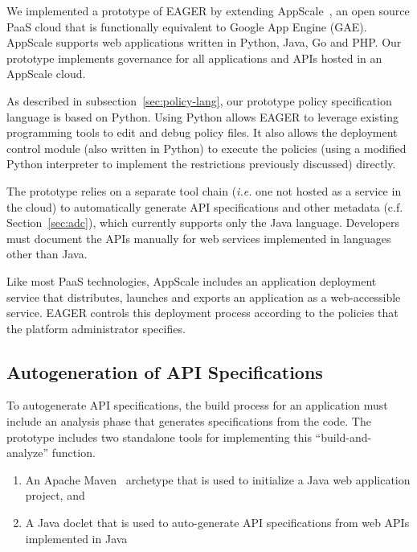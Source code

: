 We implemented a prototype of EAGER by extending AppScale~\cite{appscale13}, 
an open source PaaS cloud that is 
functionally equivalent to Google App Engine (GAE).  AppScale supports
web applications written in Python, Java, Go and PHP. Our prototype
implements governance for all applications and APIs hosted in an AppScale cloud. 

As described in subsection~\ref{sec:policy-lang}, 
our prototype policy specification
language is based on Python.
Using Python allows EAGER to leverage
existing programming tools to edit and debug policy files. 
It also allows the deployment control module (also written in Python) to
execute the policies (using a modified Python interpreter to implement the
restrictions previously discussed) directly.


The prototype relies on a separate tool chain ({\em i.e.} one not hosted as a
service in the cloud) to automatically generate
API specifications and other metadata (c.f. Section~\ref{sec:adc}), which
currently supports only the Java language.  
Developers must document the APIs manually
for web services implemented in languages other than Java.

Like most PaaS technologies, AppScale includes an application deployment
service that distributes, launches and exports an application
as a web-accessible service.  EAGER controls this deployment
process according to the policies that the platform administrator specifies.

\subsection{Autogeneration of API Specifications}
To autogenerate API specifications, the build process for an application must
include an analysis phase that generates specifications from the code.
The prototype includes two standalone tools for implementing this
``build-and-analyze'' function.
\begin{enumerate}
\vspace{0.05in}
\item An Apache Maven~\cite{maven} archetype that is used to initialize a Java
web application project, and 
\vspace{0.05in}
\item A Java doclet that is used to auto-generate API specifications from web APIs implemented in Java
\vspace{0.05in}
\end{enumerate}

